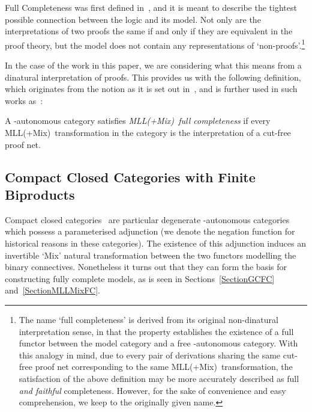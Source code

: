 \documentclass{LMCS}
\theoremstyle{plain}\newtheorem*{cLm}{Claim}
\newcommand{\mllmixmaybe}{MLL(+Mix)}
\newcommand{\p}{} \newcommand{\N}{\mathbb{N}}
\newcommand{\hugh}[1]{#1}
\begin{document}
Full Completeness was first defined in~\cite{AJ94}, and it is meant
to describe the tightest possible connection between the logic and
its model. Not only are the interpretations of two proofs the same if
and only if they are equivalent in the proof theory, but the model
does not contain any representations of `non-proofs'.\footnote{The name `full completeness' is derived from its original non-dinatural interpretation sense, in that the property establishes the existence of a full functor between the model category and a free -autonomous category. With this analogy in mind, due to every pair of derivations sharing the same cut-free proof net corresponding to the same \mllmixmaybe\ transformation, the satisfaction of the above definition may be more accurately described as full \emph{and faithful} completeness. However, for the sake of convenience and easy comprehension, we keep to the originally given name.}

\p In the case of the work in this paper, we are considering what this means from a dinatural interpretation of proofs. This provides us with the following definition, which originates from the notion as it is set out in~\cite{BS96}, and is further used in such works as~\cite{Loa94b,Tan97,Hag00}:

\begin{defi}
  A -autonomous category  satisfies \emph{\mllmixmaybe\ full
    completeness} if every \mllmixmaybe\ transformation in the
  category is the interpretation of a cut-free proof net.
\end{defi}



\subsection{Compact Closed Categories with Finite Biproducts} \label{SectionCompCCs}
 
Compact closed categories~\cite{KL80} are particular degenerate -autonomous
categories which possess a parameterised adjunction  (we denote the negation function  for historical reasons in these categories). The existence of this \hugh{adjunction} induces an invertible `Mix' natural transformation  between the two functors modelling the binary connectives. Nonetheless it turns out that they can form the basis for constructing fully complete models, as is seen in Sections~\ref{SectionGCFC} and~\ref{SectionMLLMixFC}.
\end{document}
